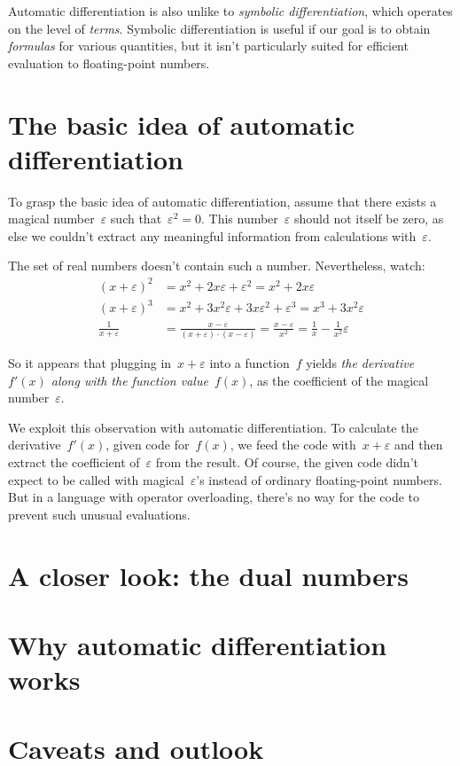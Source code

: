 \documentclass[a4paper,ngerman,12pt]{scrartcl}
\theoremstyle{definition}
\theoremstyle{plain}
\theoremstyle{remark}
\begin{document}
Automatic differentiation is also unlike to \emph{symbolic differentiation},
which operates on the level of \emph{terms}. Symbolic differentiation is useful
if our goal is to obtain \emph{formulas} for various quantities, but it isn't
particularly suited for efficient evaluation to floating-point numbers.


\section{The basic idea of automatic differentiation}

To grasp the basic idea of automatic differentiation, assume that there exists
a magical number~$\varepsilon$ such that~$\varepsilon^2 = 0$. This
number~$\varepsilon$ should not itself be zero, as else we couldn't extract any
meaningful information from calculations with~$\varepsilon$.

The set of real numbers doesn't contain such a number. Nevertheless, watch:
\begin{align*}
  (x+\varepsilon)^2 &= x^2 + 2x\varepsilon + \varepsilon^2 = x^2 + 2x\varepsilon \\
  (x+\varepsilon)^3 &= x^2 + 3x^2\varepsilon + 3x\varepsilon^2 + \varepsilon^3 = x^3 + 3x^2\varepsilon \\
  \frac{1}{x+\varepsilon} &= \frac{x-\varepsilon}{(x+\varepsilon) \cdot
  (x-\varepsilon)} = \frac{x-\varepsilon}{x^2} = \frac{1}{x} - \frac{1}{x^2}
  \varepsilon
\end{align*}

So it appears that plugging in~$x + \varepsilon$ into a function~$f$ yields
\emph{the derivative~$f'(x)$ along with the function value~$f(x)$}, as the
coefficient of the magical number~$\varepsilon$.

We exploit this observation with automatic differentiation. To calculate the
derivative~$f'(x)$, given code for~$f(x)$, we feed the code with~$x +
\varepsilon$ and then extract the coefficient of~$\varepsilon$ from the result.
Of course, the given code didn't expect to be called with
magical~$\varepsilon$'s instead of ordinary floating-point numbers. But in a
language with operator overloading, there's no way for the code to prevent such
unusual evaluations.


\section{A closer look: the dual numbers}



\section{Why automatic differentiation works}


\section{Caveats and outlook}

\end{document}

